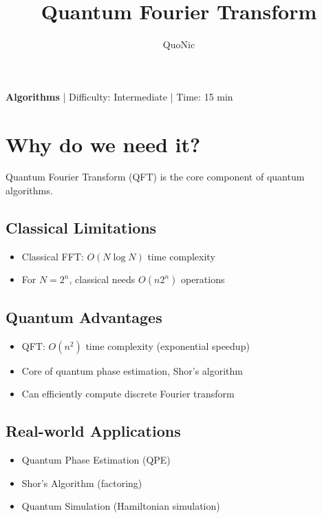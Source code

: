 \documentclass[12pt,a4paper]{article}
\title{Quantum Fourier Transform}
\author{QuoNic}
\date{}
\begin{document}
\maketitle

\begin{center}
\textbf{Algorithms} | Difficulty: Intermediate | Time: 15 min
\end{center}

\tableofcontents
\newpage

\section{Why do we need it?}

Quantum Fourier Transform (QFT) is the core component of quantum algorithms.

\subsection{Classical Limitations}
\begin{itemize}
  \item Classical FFT: $O(N \log N)$ time complexity
  \item For $N=2^n$, classical needs $O(n 2^n)$ operations
\end{itemize}

\subsection{Quantum Advantages}
\begin{itemize}
  \item QFT: $O(n^2)$ time complexity (exponential speedup)
  \item Core of quantum phase estimation, Shor's algorithm
  \item Can efficiently compute discrete Fourier transform
\end{itemize}

\subsection{Real-world Applications}
\begin{itemize}
  \item Quantum Phase Estimation (QPE)
  \item Shor's Algorithm (factoring)
  \item Quantum Simulation (Hamiltonian simulation)
\end{itemize}
\end{document}

